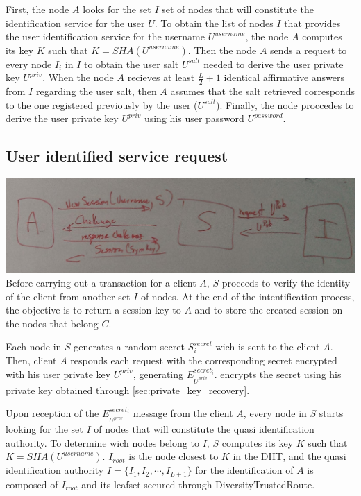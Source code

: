 First, the node $A$ looks for the set $I$ set of nodes that will constitute the
identification service for the user $U$.
To obtain the list of nodes $I$ that provides the user identification service for
the username $U^{username}$, the node $A$ computes its key $K$ such that $K =
SHA(U^{username})$. 
Then the node $A$ sends a request to every node $I_i$ in $I$ to obtain the user
salt $U^{salt}$ needed to derive the user private key $U^{priv}$.
 When the node $A$ recieves at least $\frac{L}{2} + 1$ identical affirmative answers from
$I$ regarding the user salt, then $A$ assumes that the salt retrieved
corresponds to the one registered previously by the user ($U^{salt}$). Finally,
the node proccedes to derive the user private key $U^{priv}$ using his user password $U^{password}$.

\subsection{User identified service request}
\includegraphics[width=14cm]{../img/session_creation_protocol_mockup}\\

Before carrying out a transaction for a client $A$, $S$ proceeds to
verify the identity of the client from another set $I$ of nodes. At the end of
the intentification process, the objective is to return a session key to $A$
and to store the created session on the nodes that belong $C$.

Each node in $S$ generates a random secret $S^{secret}_i$ wich is sent to the
client $A$. Then, client $A$ responds each request with the corresponding secret
encrypted with his user private key $U^{priv}$, generating
$E^{secret_i}_{U^{priv}}$. 
encrypts the secret using his private key obtained through
\ref{sec:private_key_recovery}.

Upon reception of the $E^{secret_i}_{U^{priv}}$ message from the client $A$, every node in $S$
starts looking for the set $I$ of nodes that will constitute the quasi
identification authority. To determine wich nodes belong to $I$, $S$ computes
its key $K$ such that $K = SHA(U^{username})$. $I_{root}$ is the node closest
to $K$ in the DHT, and the quasi identification authority $I = \{ I_1, I_2,
\cdots, I_{L+1}\}$ for the identification of $A$ is composed of $I_{root}$
and its leafset secured through DiversityTrustedRoute.

